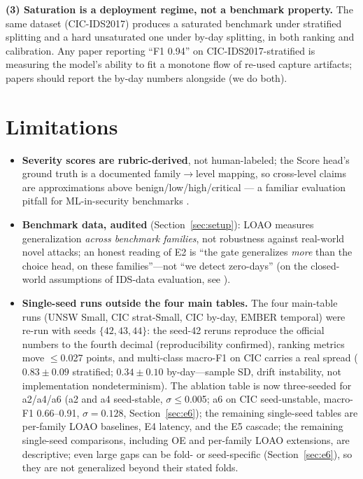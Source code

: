\documentclass[sigconf,anonymous=false]{acmart}
\begin{document}
\textbf{(3) Saturation is a deployment regime, not a benchmark property.} The same dataset (CIC-IDS2017) produces a saturated benchmark under stratified splitting and a hard unsaturated one under by-day splitting, in both ranking and calibration. Any paper reporting ``F1 0.94'' on CIC-IDS2017-stratified is measuring the model's ability to fit a monotone flow of re-used capture artifacts; papers should report the by-day numbers alongside (we do both).

\section{Limitations}
\label{sec:limits}

\begin{itemize}
\item \textbf{Severity scores are rubric-derived}, not human-labeled; the Score head's ground truth is a documented family$\to$level mapping, so cross-level claims are approximations above benign/low/high/critical --- a familiar evaluation pitfall for ML-in-security benchmarks \cite{arp2022donts}.

\item \textbf{Benchmark data, audited} (Section~\ref{sec:setup}): LOAO measures generalization \emph{across benchmark families}, not robustness against real-world novel attacks; an honest reading of E2 is ``the gate generalizes \emph{more} than the choice head, on these families''---not ``we detect zero-days'' (on the closed-world assumptions of IDS-data evaluation, see \cite{sommer2011contextual}).

\item \textbf{Single-seed runs outside the four main tables.} The four main-table runs (UNSW Small, CIC strat-Small, CIC by-day, EMBER temporal) were re-run with seeds $\{42,43,44\}$: the seed-42 reruns reproduce the official numbers to the fourth decimal (reproducibility confirmed), ranking metrics move $\le$0.027 points, and multi-class macro-F1 on CIC carries a real spread ($0.83\pm0.09$ stratified; $0.34\pm0.10$ by-day---sample SD, drift instability, not implementation nondeterminism). The ablation table is now three-seeded for a2/a4/a6 (a2 and a4 seed-stable, $\sigma\le$0.005; a6 on CIC seed-unstable, macro-F1 0.66--0.91, $\sigma{=}0.128$, Section~\ref{sec:e6}); the remaining single-seed tables are per-family LOAO baselines, E4 latency, and the E5 cascade; the remaining single-seed comparisons, including OE and per-family LOAO extensions, are descriptive; even large gaps can be fold- or seed-specific (Section~\ref{sec:e6}), so they are not generalized beyond their stated folds.


\end{itemize}
\end{document}
